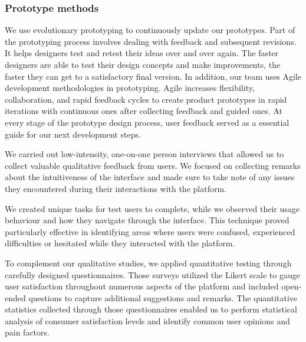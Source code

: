 \subsubsection{Prototype methods}
We use evolutionary prototyping to continuously update our prototypes. Part of
the prototyping process involves dealing with feedback and subsequent revisions.
It helps designers test and retest their ideas over and over again. The faster
designers are able to test their design concepts and make improvements, the
faster they can get to a satisfactory final version. In addition, our team uses
Agile development methodologies in prototyping. Agile increases flexibility,
collaboration, and rapid feedback cycles to create product prototypes in rapid
iterations with continuous ones after collecting feedback and guided ones.
At every stage of the prototype design process, user feedback served as a
essential guide for our next development steps.

We carried out low-intensity, one-on-one person interviews that allowed us to 
collect valuable qualitative feedback from users. We focused on collecting remarks 
about the intuitiveness of the interface and made sure to take note of any issues 
they encountered during their interactions with the platform.

We created unique tasks for test users to complete, while we observed their usage 
behaviour and how they navigate through the interface. This technique proved
particularly effective in identifying areas where users were confused, experienced 
difficulties or hesitated while they interacted with the platform.

To complement our qualitative studies, we applied quantitative testing through 
carefully designed questionnaires. Those surveys utilized the Likert scale to 
gauge user satisfaction throughout numerous aspects of the platform
and included open-ended questions to capture additional suggestions and remarks.
The quantitative statistics collected through those questionnaires enabled us to
perform statistical analysis of consumer satisfaction levels and identify common
user opinions and pain factors.

